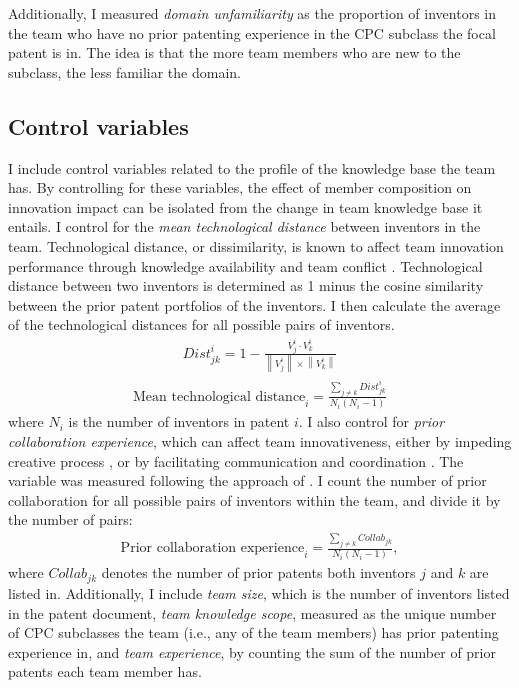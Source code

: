 \documentclass{article}
\begin{document}
Additionally, I measured \textit{domain unfamiliarity} as the proportion of inventors in the team who have no prior patenting experience in the CPC subclass the focal patent is in. The idea is that the more team members who are new to the subclass, the less familiar the domain.


\subsection{Control variables}
I include control variables related to the profile of the knowledge base the team has. By controlling for these variables, the effect of member composition on innovation impact can be isolated from the change in team knowledge base it entails. I control for the \textit{mean technological distance} between inventors in the team. Technological distance, or dissimilarity, is known to affect team innovation performance through knowledge availability and team conflict \autocite{Huo2019}. Technological distance between two inventors is determined as 1 minus the cosine similarity between the prior patent portfolios of the inventors. I then calculate the average of the technological distances for all possible pairs of inventors.
\begin{align*}
    Dist_{jk}^i=1-\frac{V_j^i\cdot V_k^i}{\left\lVert V_j^i\right\rVert \times \left\lVert V_k^i\right\rVert }
\end{align*}
\begin{align*}
    \text{Mean technological distance}_i = \frac{\sum_{j\neq k}Dist_{jk}^i}{N_i(N_i-1)}
\end{align*}
where $N_i$ is the number of inventors in patent $i$.
I also control for \textit{prior collaboration experience}, which can affect team innovativeness, either by impeding creative process \autocite{Skilton2010}, or by facilitating communication and coordination \autocite{Seo2020}. The variable was measured following the approach of \textcite{Reagans2005}. I count the number of prior collaboration for all possible pairs of inventors within the team, and divide it by the number of pairs:
\begin{align*}
    \text{Prior collaboration experience}_i = \frac{\sum_{j\neq k}Collab_{jk}}{N_i(N_i-1)},
\end{align*}
where $Collab_{jk}$ denotes the number of prior patents both inventors $j$ and $k$ are listed in.
Additionally, I include \textit{team size}, which is the number of inventors listed in the patent document, \textit{team knowledge scope}, measured as the unique number of CPC subclasses the team (i.e., any of the team members) has prior patenting experience in, and \textit{team experience}, by counting the sum of the number of prior patents each team member has.
\end{document}
